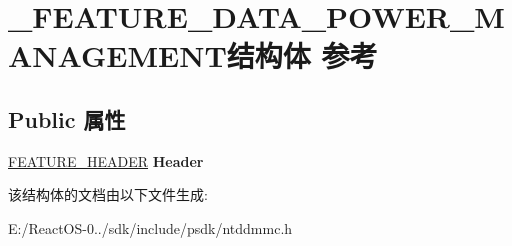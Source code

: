 \hypertarget{struct___f_e_a_t_u_r_e___d_a_t_a___p_o_w_e_r___m_a_n_a_g_e_m_e_n_t}{}\section{\+\_\+\+F\+E\+A\+T\+U\+R\+E\+\_\+\+D\+A\+T\+A\+\_\+\+P\+O\+W\+E\+R\+\_\+\+M\+A\+N\+A\+G\+E\+M\+E\+N\+T结构体 参考}
\label{struct___f_e_a_t_u_r_e___d_a_t_a___p_o_w_e_r___m_a_n_a_g_e_m_e_n_t}
\subsection*{Public 属性}
\begin{DoxyCompactItemize}
\item 
\mbox{\label{struct___f_e_a_t_u_r_e___d_a_t_a___p_o_w_e_r___m_a_n_a_g_e_m_e_n_t_a8627fe8253a66cc8473010721f30cac8}} 
\hyperlink{struct___f_e_a_t_u_r_e___h_e_a_d_e_r}{F\+E\+A\+T\+U\+R\+E\+\_\+\+H\+E\+A\+D\+ER} {\bfseries Header}
\end{DoxyCompactItemize}


该结构体的文档由以下文件生成\+:\begin{DoxyCompactItemize}
\item 
E\+:/\+React\+O\+S-\/0../sdk/include/psdk/ntddmmc.\+h\end{DoxyCompactItemize}
